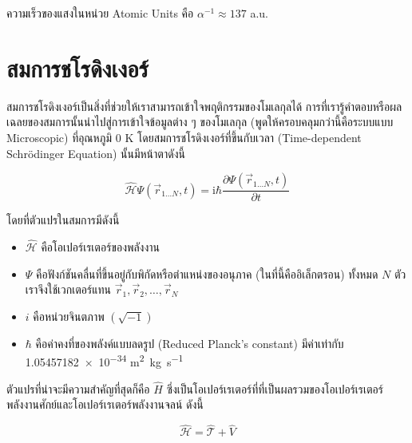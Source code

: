 \noindent ความเร็วของแสงในหน่วย Atomic Units คือ $\alpha^{-1}\approx 137$ a.u.

\section{สมการชโรดิงเงอร์}

สมการชโรดิงเงอร์เป็นสิ่งที่ช่วยให้เราสามารถเข้าใจพฤติกรรมของโมเลกุลได้ การที่เรารู้คำตอบหรือผลเฉลยของสมการนั้นนำไปสู่การเข้าใจข้อมูลต่าง ๆ
ของโมเลกุล (พูดให้ครอบคลุมกว่านี้คือระบบแบบ Microscopic) ที่อุณหภูมิ 0 K โดยสมการชโรดิงเงอร์ที่ขึ้นกับเวลา (Time-dependent
Schr\"{o}dinger Equation) นั้นมีหน้าตาดังนี้

\begin{equation}
    \label{eq:time_dependent_schrodinger}
    \hat{\mathscr{H}} \Psi\left(\vec{r}_{1 \ldots N}, t\right)
    =
    \mathrm{i} \hbar
    \frac
    {
        \partial \Psi\left(\vec{r}_{1 \ldots N}, t\right)
    }
    {
        \partial t
    }
\end{equation}

\noindent โดยที่ตัวแปรในสมการมีดังนี้
\begin{itemize}[topsep=0pt,noitemsep]
    \setlength\itemsep{1em}
    \item $\hat{\mathscr{H}}$ คือโอเปอร์เรเตอร์ของพลังงาน

    \item $\Psi$ คือฟังก์ชันคลื่นที่ขึ้นอยู่กับพิกัดหรือตำแหน่งของอนุภาค (ในที่นี้คืออิเล็กตรอน) ทั้งหมด $N$ ตัว เราจึงใช้เวกเตอร์แทน
          $\vec{r}_{1}, \vec{r}_{2}, \dots, \vec{r}_{N}$

    \item $i$ คือหน่วยจินตภาพ $(\sqrt{-1})$

    \item $\hbar$ คือค่าคงที่ของพลังค์แบบลดรูป (Reduced Planck's constant) มีค่าเท่ากับ
          \num{1.05457182e-34} \si{m^{2}.kg.s^{-1}}
\end{itemize}

ตัวแปรที่น่าจะมีความสำคัญที่สุดก็คือ $\hat{H}$ ซึ่งเป็นโอเปอร์เรเตอร์ที่ที่เป็นผลรวมของโอเปอร์เรเตอร์พลังงานศักย์และโอเปอร์เรเตอร์พลังงานจลน์
ดังนี้

\begin{equation}
    \label{eq:hamiltonian_operator}
    \hat{\mathscr{H}} = \hat{\mathscr{T}}+\hat{V}
\end{equation}

